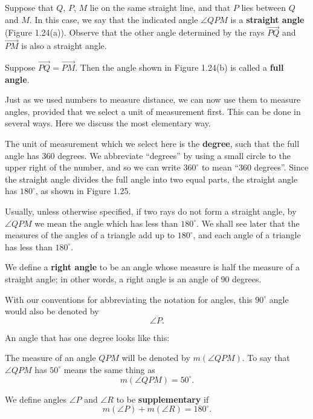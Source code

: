 \documentclass[12pt]{book} %
\begin{document}
Suppose that $Q$, $P$, $M$ lie on the same straight line, and that $P$ lies between $Q$ and $M$. In this case, we say that the indicated angle $\angle QPM$ is a \textbf{straight angle} (Figure 1.24(a)). Observe that the other angle determined by the rays $\overrightarrow{PQ}$ and $\overrightarrow{PM}$ is also a straight angle.

Suppose $\overrightarrow{PQ}=\overrightarrow{PM}$. Then the angle shown in Figure 1.24(b) is called a \textbf{full angle}.


Just as we used numbers to measure distance, we can now use them to measure angles, provided that we select a unit of measurement first. This can be done in several ways. Here we discuss the most elementary way.

The unit of measurement which we select here is the \textbf{degree}, such that the full angle has 360 degrees. We abbreviate ``degrees'' by using a small circle to the upper right of the number, and so we can write $360^\circ$ to mean ``360 degrees''. Since the straight angle divides the full angle into two equal parts, the straight angle has $180^\circ$, as shown in Figure 1.25.


Usually, unless otherwise specified, if two rays do not form a straight angle, by $\angle QPM$ we mean the angle which has less than $180^\circ$. We shall see later that the measures of the angles of a triangle add up to $180^\circ$, and each angle of a triangle has less than $180^\circ$.

We define a \textbf{right angle} to be an angle whose measure is half the measure of a straight angle; in other words, a right angle is an angle of 90 degrees.


With our conventions for abbreviating the notation for angles, this $90^\circ$ angle would also be denoted by
\[
\angle P.
\]

An angle that has one degree looks like this:


The measure of an angle $QPM$ will be denoted by $m(\angle QPM)$. To say that $\angle QPM$ has $50^\circ$ means the same thing as
\[
m(\angle QPM)=50^\circ.
\]

We define angles $\angle P$ and $\angle R$ to be \textbf{supplementary} if
\[
m(\angle P)+m(\angle R)=180^\circ.
\]
\end{document}
